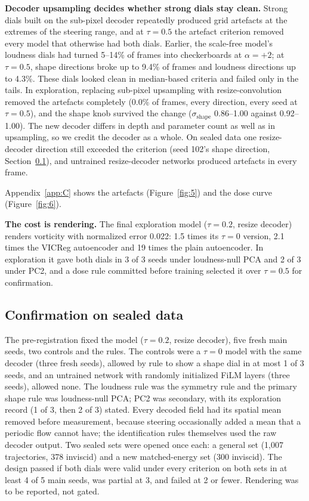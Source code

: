 \documentclass[10pt]{article}
\begin{document}
\textbf{Decoder upsampling decides whether strong dials stay clean.} Strong dials built on the sub-pixel decoder repeatedly produced grid artefacts at the extremes of the steering range, and at $\tau = 0.5$ the artefact criterion removed every model that otherwise had both dials. Earlier, the scale-free model's loudness dials had turned 5--14\% of frames into checkerboards at $\alpha = +2$; at $\tau = 0.5$, shape directions broke up to 9.4\% of frames and loudness directions up to 4.3\%. These dials looked clean in median-based criteria and failed only in the tails. In exploration, replacing sub-pixel upsampling with resize-convolution removed the artefacts completely (0.0\% of frames, every direction, every seed at $\tau = 0.5$), and the shape knob survived the change ($\sigma_{\mathrm{shape}}$ 0.86--1.00 against 0.92--1.00). The new decoder differs in depth and parameter count as well as in upsampling, so we credit the decoder as a whole. On sealed data one resize-decoder direction still exceeded the criterion (seed 102's shape direction, Section~\ref{sec:6.5}), and untrained resize-decoder networks produced artefacts in every frame.

Appendix~\ref{app:C} shows the artefacts (Figure~\ref{fig:5}) and the dose curve (Figure~\ref{fig:6}).

\textbf{The cost is rendering.} The final exploration model ($\tau = 0.2$, resize decoder) renders vorticity with normalized error 0.022: 1.5 times its $\tau = 0$ version, 2.1 times the VICReg autoencoder and 19 times the plain autoencoder. In exploration it gave both dials in 3 of 3 seeds under loudness-null PCA and 2 of 3 under PC2, and a dose rule committed before training selected it over $\tau = 0.5$ for confirmation.

\subsection{Confirmation on sealed data}\label{sec:6.5}

The pre-registration fixed the model ($\tau = 0.2$, resize decoder), five fresh main seeds, two controls and the rules. The controls were a $\tau = 0$ model with the same decoder (three fresh seeds), allowed by rule to show a shape dial in at most 1 of 3 seeds, and an untrained network with randomly initialized FiLM layers (three seeds), allowed none. The loudness rule was the symmetry rule and the primary shape rule was loudness-null PCA; PC2 was secondary, with its exploration record (1 of 3, then 2 of 3) stated. Every decoded field had its spatial mean removed before measurement, because steering occasionally added a mean that a periodic flow cannot have; the identification rules themselves used the raw decoder output. Two sealed sets were opened once each: a general set (1,007 trajectories, 378 inviscid) and a new matched-energy set (300 inviscid). The design passed if both dials were valid under every criterion on both sets in at least 4 of 5 main seeds, was partial at 3, and failed at 2 or fewer. Rendering was to be reported, not gated.
\end{document}
